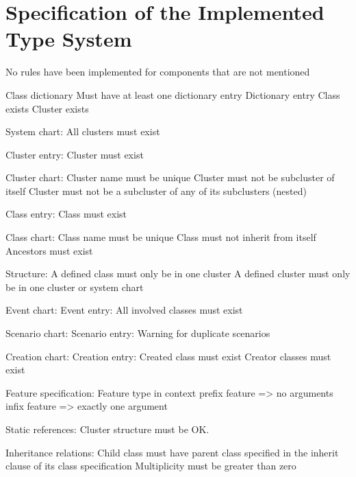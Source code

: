 \chapter{Specification of the Implemented Type System}
\label{appendix-type-system}
No rules have been implemented for components that are not mentioned

Class dictionary
	Must have at least one dictionary entry
Dictionary entry
	Class exists
	Cluster exists

System chart:
All clusters must exist

Cluster entry:
	Cluster must exist

Cluster chart:
	Cluster name must be unique
	Cluster must not be subcluster of itself
	Cluster must not be a subcluster of any of its subclusters (nested)

Class entry:
	Class must exist

Class chart:
	Class name must be unique
	Class must not inherit from itself
	Ancestors must exist

Structure:
	A defined class must only be in one cluster
	A defined cluster must only be in one cluster or system chart

Event chart:
	Event entry:
		All involved classes must exist

Scenario chart:
	Scenario entry:
		Warning for duplicate scenarios

Creation chart:
	Creation entry:
		Created class must exist
		Creator classes must exist
	
	

Feature specification:
	Feature type in context
	prefix feature => no arguments
	infix feature => exactly one argument

Static references:
Cluster structure must be OK.

Inheritance relations:
Child class must have parent class specified in the inherit clause of its class specification
Multiplicity must be greater than zero